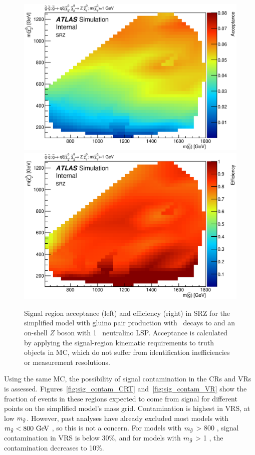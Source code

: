 \begin{figure}[ht]
\centering
\includegraphics[width=.48\textwidth]{figures/signalacceptcontam/acc_SM_GG_N2_1.eps}
\includegraphics[width=.48\textwidth]{figures/signalacceptcontam/eff_SM_GG_N2_1.eps}
\caption{
Signal region acceptance (left) and efficiency (right) in SRZ for the simplified model with gluino pair production with \chitwozero\ decays to \chionezero and an on-shell $Z$ boson with 1 \gev~neutralino LSP.  
Acceptance is calculated by applying the signal-region kinematic requirements to truth objects in \ac{MC}, which do not suffer from identification inefficiencies or measurement resolutions.
}
\label{fig:acc_SMGGN2_1_z}
\end{figure}

Using the same \ac{MC}, the possibility of signal contamination in the \acp{CR} and \acp{VR} is assessed. Figures~\ref{fig:sig_contam_CRT} and~\ref{fig:sig_contam_VR} show the fraction of events in these regions expected to come from signal for different points on the simplified model's mass grid. Contamination is highest in VRS, at low $m_{\tilde g}$. However, past analyses have already excluded most models with $m_\go < 800 \gev$ \cite{SUSY-2014-10}, so this is not a concern. For models with $m_{\tilde g}$ > 800 \gev, signal contamination in VRS is below 30\%, and for models with $m_{\tilde g}$ > 1 \tev, the contamination decreases to 10\%.

